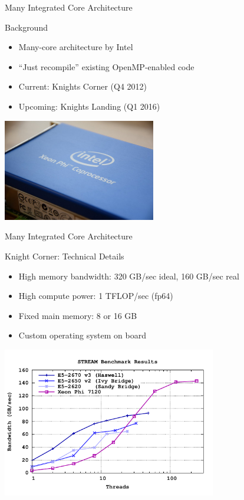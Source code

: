
\begin{frame}{Many Integrated Core Architecture}
 
 \begin{block}{Background}
  \begin{itemize}
   \item Many-core architecture by Intel
   \item ``Just recompile'' existing OpenMP-enabled code
   \item Current: Knights Corner (Q4 2012)
   \item Upcoming: Knights Landing (Q1 2016)
  \end{itemize}
 \end{block}
 
 \begin{center}
  \includegraphics[width=0.5\textwidth]{figures/xeon-phi}
 \end{center}

\end{frame}

\begin{frame}{Many Integrated Core Architecture}
 
 \begin{block}{Knight Corner: Technical Details}
  \begin{itemize}
   \item High memory bandwidth: 320 GB/sec ideal, 160 GB/sec real
   \item High compute power: 1 TFLOP/sec (fp64)
   \item Fixed main memory: 8 or 16 GB
   \item Custom operating system on board
  \end{itemize}
 \end{block}
 
 \vspace*{-0.5cm}
 \begin{center}
  \includegraphics[width=0.7\textwidth]{figures/stream}
 \end{center}

\end{frame}



